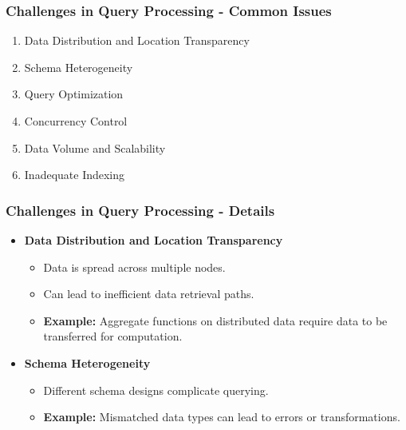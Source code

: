 \documentclass[aspectratio=169]{beamer}
\begin{document}
\begin{frame}[fragile]
    \frametitle{Challenges in Query Processing - Common Issues}
    \begin{enumerate}
        \item Data Distribution and Location Transparency
        \item Schema Heterogeneity
        \item Query Optimization
        \item Concurrency Control
        \item Data Volume and Scalability
        \item Inadequate Indexing
    \end{enumerate}
\end{frame}

\begin{frame}[fragile]
    \frametitle{Challenges in Query Processing - Details}
    \begin{itemize}
        \item \textbf{Data Distribution and Location Transparency}
            \begin{itemize}
                \item Data is spread across multiple nodes.
                \item Can lead to inefficient data retrieval paths.
                \item \textbf{Example:} Aggregate functions on distributed data require data to be transferred for computation.
            \end{itemize}
        
        \item \textbf{Schema Heterogeneity}
            \begin{itemize}
                \item Different schema designs complicate querying.
                \item \textbf{Example:} Mismatched data types can lead to errors or transformations.
            \end{itemize}
    \end{itemize}
\end{frame}
\end{document}
